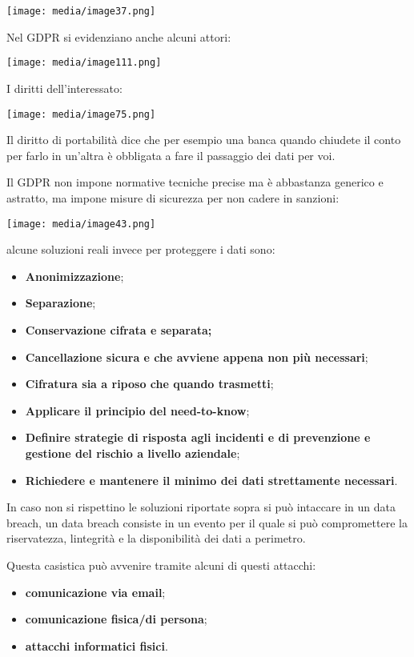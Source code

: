 \texttt{[image: media/image37.png]}

Nel GDPR si evidenziano anche alcuni attori:

\texttt{[image: media/image111.png]}

I diritti dell'interessato:

\texttt{[image: media/image75.png]}

Il diritto di portabilità dice che per esempio una banca quando chiudete
il conto per farlo in un'altra è obbligata a fare il passaggio dei dati
per voi.

Il GDPR non impone normative tecniche precise ma è abbastanza generico e
astratto, ma impone misure di sicurezza per non cadere in sanzioni:

\texttt{[image: media/image43.png]}

alcune soluzioni reali invece per proteggere i dati sono:

\begin{itemize}
\item
  \textbf{Anonimizzazione};
\item
  \textbf{Separazione};
\item
  \textbf{Conservazione cifrata e separata;}
\item
  \textbf{Cancellazione sicura e che avviene appena non più necessari};
\item
  \textbf{Cifratura sia a riposo che quando trasmetti};
\item
  \textbf{Applicare il principio del need-to-know};
\item
  \textbf{Definire strategie di risposta agli incidenti e di prevenzione
  e gestione del rischio a livello aziendale};
\item
  \textbf{Richiedere e mantenere il minimo dei dati strettamente
  necessari}.
\end{itemize}

In caso non si rispettino le soluzioni riportate sopra si può intaccare
in un data breach, un data breach consiste in un evento per il quale si
può compromettere la riservatezza, l\textquotesingle integrità e la
disponibilità dei dati a perimetro.

Questa casistica può avvenire tramite alcuni di questi attacchi:

\begin{itemize}
\item
  \textbf{comunicazione via email};
\item
  \textbf{comunicazione fisica/di persona};
\item
  \textbf{attacchi informatici fisici}.
\end{itemize}

